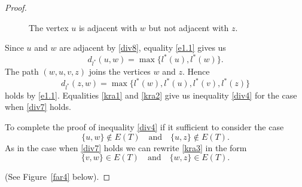 \documentclass[11pt]{article}
\theoremstyle{definition}
\theoremstyle{remark}
\numberwithin{equation}{section}
\begin{document}
\begin{proof}
\begin{figure}[H]
\begin{center}

\end{center}
\caption{The vertex \( u \) is adjacent
with \( w \) but not adjacent with \( z \).}
\label{far3}
\end{figure}


Since $u$ and $w$ are adjacent by \eqref{div8}, equality \eqref{e1.1} gives us 
\begin{equation}
\label{kra1}
d_{l^*}(u,w)=\max \{l^*(u),l^*(w)\}.
\end{equation}
The path $(w,u,v,z)$ joins the vertices $w$ and $z$. Hence 
\begin{equation}
    \label{kra2}
d_{l^*}(z,w)=\max\{l^*(w),l^*(u),l^*(v),l^*(z)\}
\end{equation}
holds by \eqref{e1.1}.
Equalities \eqref{kra1} and \eqref{kra2} give us inequality \eqref{div4} for the case when \eqref{div7} holds.

To complete the proof of inequality \eqref{div4} if it sufficient to consider the case 
\begin{equation}
\label{kra3}
    \{u,w\}\notin E(T) \quad \text{and}\quad \{u,z\}\notin E(T).
\end{equation}
As in the case when \eqref{div7} holds we can rewrite \eqref{kra3} in the form
\begin{equation}
    \label{kra4}
    \{v,w\}\in E(T)\quad \text{and}\quad \{w,z\}\in E(T).
\end{equation}

(See Figure~\ref{far4} below).




\end{proof}
\end{document}
